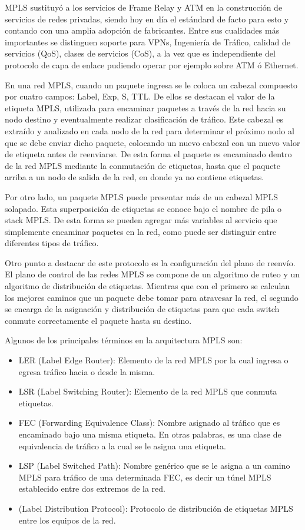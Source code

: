 MPLS sustituy\'o a los servicios de Frame Relay y ATM en la construcci\'on de servicios de redes privadas, siendo hoy en d\'ia el est\'andard de facto para esto y contando con una amplia adopci\'on de fabricantes. Entre sus cualidades m\'as importantes se distinguen soporte para VPNs, Ingeniería de Tráfico, calidad de servicios (QoS), clases de servicios (CoS), a la vez que es independiente del protocolo de capa de enlace pudiendo operar por ejemplo sobre ATM ó Ethernet.

En una red MPLS, cuando un paquete ingresa se le coloca un cabezal compuesto por cuatro campos: Label, Exp, S, TTL. De ellos se destacan el valor de la etiqueta MPLS, utilizada para encaminar paquetes a través de la red hacia su nodo destino y eventualmente realizar clasificación de tr\'afico. Este cabezal es extraído y analizado en cada nodo de la red para determinar el próximo nodo al que se debe enviar dicho paquete, colocando un nuevo cabezal con un nuevo valor de etiqueta antes de reenviarse. De esta forma el paquete es encaminado dentro de la red MPLS mediante la conmutaci\'on de etiquetas, hasta que el paquete arriba a un nodo de salida de la red, en donde ya no contiene etiquetas.

Por otro lado, un paquete MPLS puede presentar más de un cabezal MPLS solapado. Esta superposición de etiquetas se conoce bajo el nombre de pila o stack MPLS. De esta forma se pueden agregar más variables al servicio que simplemente encaminar paquetes en la red, como puede ser distinguir entre diferentes tipos de tráfico.

Otro punto a destacar de este protocolo es la configuración del plano de reenvío. El plano de control de las redes MPLS se compone de un algoritmo de ruteo y un algoritmo de distribución de etiquetas. Mientras que con el primero se calculan los mejores caminos que un paquete debe tomar para atravesar la red, el segundo se encarga de la asignación y distribución de etiquetas para que cada switch conmute correctamente el paquete hasta su destino.

Algunos de los principales términos en la arquitectura MPLS son:

\begin{itemize}
\item LER (Label Edge Router): Elemento de la red MPLS por la cual ingresa o egresa tráfico hacia o desde la misma.
\item LSR (Label Switching Router): Elemento de la red MPLS que conmuta etiquetas.
\item FEC (Forwarding Equivalence Class): Nombre asignado al tráfico que es encaminado bajo una misma etiqueta. En otras palabras, es una clase de equivalencia de tráfico a la cual se le asigna una etiqueta.
\item LSP (Label Switched Path): Nombre genérico que se le asigna a un camino MPLS para tráfico de una determinada FEC, es decir un túnel MPLS establecido entre dos extremos de la red.
\item {} (Label Distribution Protocol): Protocolo de distribución de etiquetas MPLS entre los equipos de la red.
 
\end{itemize}

